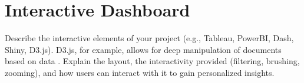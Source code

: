 \section{Interactive Dashboard}
Describe the interactive elements of your project (e.g., Tableau, PowerBI, Dash, Shiny, D3.js). D3.js, for example, allows for deep manipulation of documents based on data \cite{bostock2011d3}. Explain the layout, the interactivity provided (filtering, brushing, zooming), and how users can interact with it to gain personalized insights. \lipsum[7][1-4]